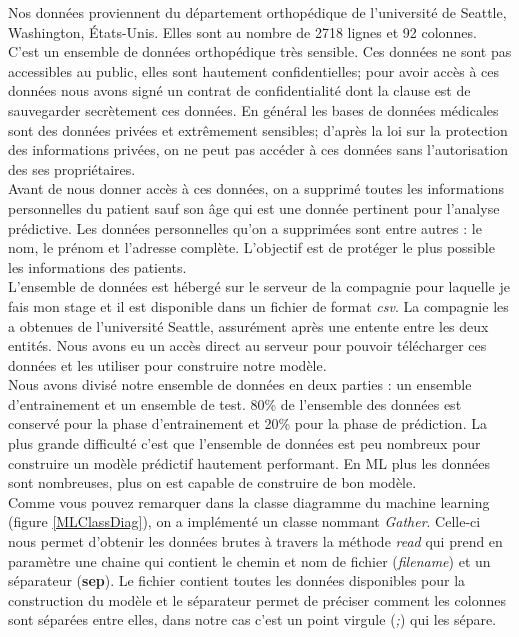 \documentclass[12pt, french]{report}
\begin{document}
Nos données proviennent du département orthopédique de l'université de Seattle, Washington, États-Unis. Elles sont au nombre de 2718 lignes et 92 colonnes. C'est un ensemble de données orthopédique très sensible. Ces données ne sont pas accessibles au public, elles sont hautement confidentielles; pour avoir accès à ces données nous avons signé un contrat de confidentialité dont la clause est de sauvegarder secrètement ces données. En général les bases de données médicales sont des données privées et extrêmement sensibles; d'après la loi sur la protection des informations privées, on ne peut pas accéder à ces données sans l'autorisation des ses propriétaires. \\

Avant de nous donner accès à ces données, on a supprimé toutes les informations personnelles du patient sauf son âge qui est une donnée pertinent pour l'analyse prédictive. Les données personnelles qu'on a supprimées sont entre autres : le nom, le prénom et l'adresse complète. L'objectif est de protéger le plus possible les informations des patients. \\

L'ensemble de données est hébergé sur le serveur de la compagnie pour laquelle je fais mon stage et il est disponible dans un fichier de format \textit{csv}. La compagnie les a obtenues de l'université Seattle, assurément après une entente entre les deux entités. Nous avons eu un accès direct au serveur pour pouvoir télécharger ces données et les utiliser pour construire notre modèle.\\

Nous avons divisé notre ensemble de données en deux parties : un ensemble d'entrainement et un ensemble de test. 80\% de l'ensemble des données est conservé pour la phase d'entrainement et 20\% pour la phase de prédiction. La plus grande difficulté c'est que l'ensemble de données est peu nombreux pour construire un modèle prédictif hautement performant. En ML plus les données sont nombreuses, plus on est capable de construire de bon modèle. \\

Comme vous pouvez remarquer dans la classe diagramme du machine learning (figure \ref{MLClassDiag}), on a implémenté un classe nommant \textit{Gather}. Celle-ci nous permet d'obtenir les données brutes à travers la méthode \textit{read} qui prend en paramètre une chaine qui contient le chemin et nom de fichier (\textit{filename}) et un séparateur (\textbf{sep}). Le fichier contient toutes les données disponibles pour la construction du modèle et le séparateur permet de préciser comment les colonnes sont séparées entre elles, dans notre cas c'est un point virgule (\textit{;}) qui les sépare.\\
\end{document}
